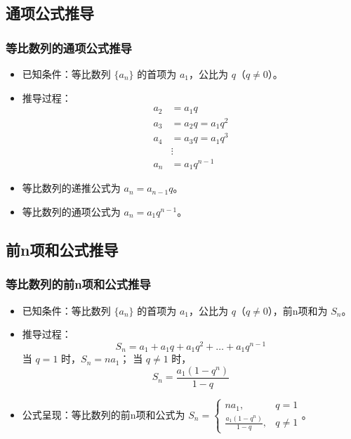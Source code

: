 \documentclass{ctexbeamer}
\begin{document}
\subsection{通项公式推导}
\begin{frame}
\frametitle{等比数列的通项公式推导}
\begin{itemize}
    \item 已知条件：等比数列 $\{a_n\}$ 的首项为 $a_1$，公比为 $q$（$q \neq 0$）。
    \item 推导过程：
        \begin{align*}
            a_2 &= a_1q \\
            a_3 &= a_2q = a_1q^2 \\
            a_4 &= a_3q = a_1q^3 \\
            &\vdots \\
            a_n &= a_1q^{n-1}
        \end{align*}
    \item 等比数列的递推公式为 $a_n = a_{n-1}q$。
    \item 等比数列的通项公式为 $a_n = a_1q^{n-1}$。
\end{itemize}
\end{frame}

\subsection{前n项和公式推导}
\begin{frame}
\frametitle{等比数列的前n项和公式推导}
\begin{itemize}
    \item 已知条件：等比数列 $\{a_n\}$ 的首项为 $a_1$，公比为 $q$（$q \neq 0$），前n项和为 $S_n$。
    \item 推导过程：
        \[
            S_n = a_1 + a_1q + a_1q^2 + \ldots + a_1q^{n-1}
        \]
        当 $q = 1$ 时，$S_n = na_1$；
        当 $q \neq 1$ 时，
        \[
            S_n = \frac{a_1(1 - q^n)}{1 - q}
        \]
    \item 公式呈现：等比数列的前n项和公式为 $S_n = \begin{cases}
        na_1, & q = 1 \\
        \frac{a_1(1 - q^n)}{1 - q}, & q \neq 1
    \end{cases}$。
\end{itemize}
\end{frame}
\end{document}
